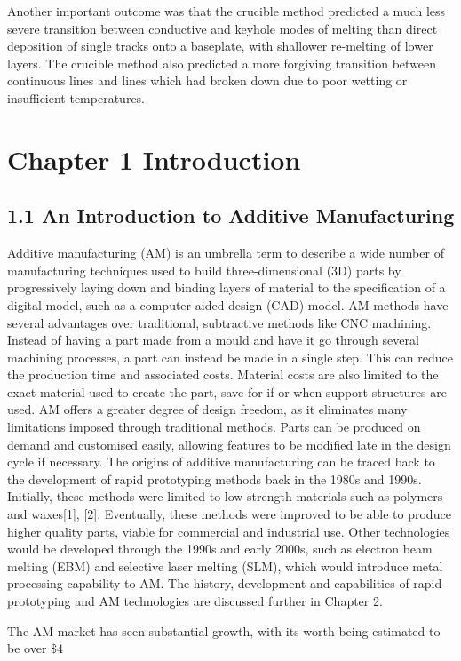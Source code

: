 \documentclass[10pt]{article}
\begin{document}
Another important outcome was that the crucible method predicted a much less severe transition between conductive and keyhole modes of melting than direct deposition of single tracks onto a baseplate, with shallower re-melting of lower layers. The crucible method also predicted a more forgiving transition between continuous lines and lines which had broken down due to poor wetting or insufficient temperatures.

\section*{Chapter 1 Introduction}
\subsection*{1.1 An Introduction to Additive Manufacturing}
Additive manufacturing (AM) is an umbrella term to describe a wide number of manufacturing techniques used to build three-dimensional (3D) parts by progressively laying down and binding layers of material to the specification of a digital model, such as a computer-aided design (CAD) model. AM methods have several advantages over traditional, subtractive methods like CNC machining. Instead of having a part made from a mould and have it go through several machining processes, a part can instead be made in a single step. This can reduce the production time and associated costs. Material costs are also limited to the exact material used to create the part, save for if or when support structures are used. AM offers a greater degree of design freedom, as it eliminates many limitations imposed through traditional methods. Parts can be produced on demand and customised easily, allowing features to be modified late in the design cycle if necessary. The origins of additive manufacturing can be traced back to the development of rapid prototyping methods back in the 1980s and 1990s. Initially, these methods were limited to low-strength materials such as polymers and waxes[1], [2]. Eventually, these methods were improved to be able to produce higher quality parts, viable for commercial and industrial use. Other technologies would be developed through the 1990s and early 2000s, such as electron beam melting (EBM) and selective laser melting (SLM), which would introduce metal processing capability to AM. The history, development and capabilities of rapid prototyping and AM technologies are discussed further in Chapter 2.

The AM market has seen substantial growth, with its worth being estimated to be over $\$ 4$
\end{document}
